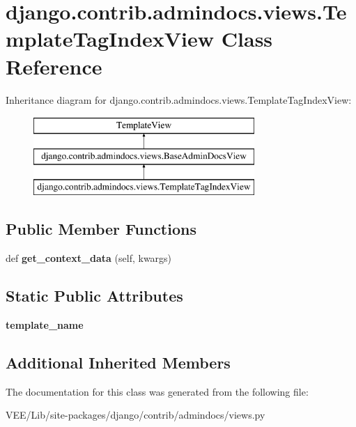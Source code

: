 \hypertarget{classdjango_1_1contrib_1_1admindocs_1_1views_1_1_template_tag_index_view}{}\section{django.\+contrib.\+admindocs.\+views.\+Template\+Tag\+Index\+View Class Reference}
\label{classdjango_1_1contrib_1_1admindocs_1_1views_1_1_template_tag_index_view}
Inheritance diagram for django.\+contrib.\+admindocs.\+views.\+Template\+Tag\+Index\+View\+:\begin{figure}[H]
\begin{center}
\leavevmode
\includegraphics[height=3.000000cm]{classdjango_1_1contrib_1_1admindocs_1_1views_1_1_template_tag_index_view}
\end{center}
\end{figure}
\subsection*{Public Member Functions}
\begin{DoxyCompactItemize}
\item 
\mbox{\label{classdjango_1_1contrib_1_1admindocs_1_1views_1_1_template_tag_index_view_ae64237b7cea1be045a2dc0d61edfe785}} 
def {\bfseries get\+\_\+context\+\_\+data} (self, kwargs)
\end{DoxyCompactItemize}
\subsection*{Static Public Attributes}
\begin{DoxyCompactItemize}
\item 
\mbox{\label{classdjango_1_1contrib_1_1admindocs_1_1views_1_1_template_tag_index_view_a3e8d0763bfa6f885f04593aa0c6b26c6}} 
{\bfseries template\+\_\+name}
\end{DoxyCompactItemize}
\subsection*{Additional Inherited Members}


The documentation for this class was generated from the following file\+:\begin{DoxyCompactItemize}
\item 
V\+E\+E/\+Lib/site-\/packages/django/contrib/admindocs/views.\+py\end{DoxyCompactItemize}
